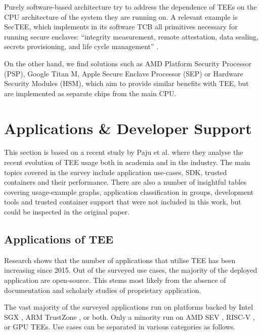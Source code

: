\documentclass[runningheads,a4paper]{uwsese}
\begin{document}
Purely software-based architecture try to address the dependence of \glspl{TEE}
on the \gls{CPU} architecture of the system they are running on. A relevant example
is SecTEE, which implements in its software \gls{TCB} all primitives necessary
for running secure enclaves: ``integrity measurement, remote attestation, data
sealing, secrets provisioning, and life cycle management'' \cite{sec_tee}.

On the other hand, we find solutions such as AMD Platform Security Processor
(PSP), Google Titan M, Apple Secure Enclave Processor (SEP) or Hardware
Security Modules (HSM), which aim to provide similar benefits with \gls{TEE},
but are implemented as separate chips from the main \gls{CPU}.



\section{Applications \& Developer Support}

This section is based on a recent study by Paju et al. \cite{tee_app_rev} where
they analyse the recent evolution of \gls{TEE} usage both in academia and in the
industry. The main topics covered in the survey include application use-cases,
\gls{SDK}, trusted containers and their performance.
There are also a number of insightful tables covering usage-example graphs,
application classification in groups, development tools and trusted container
support that were not included in this work, but could be inspected in the
original paper.

\subsection{Applications of \gls{TEE}}

Research shows that the number of applications that utilise \gls{TEE} has been
increasing since 2015. Out of the surveyed use cases, the majority of the
deployed application are open-source. This stems most likely from the absence
of documentation and scholarly studies of proprietary application.

The vast majority of the surveyed applications run on platforms backed by Intel
SGX \cite{intel_sgx}, ARM TrustZone \cite{arm_tz}, or both. Only a minority run
on AMD SEV \cite{amd_sev}, RISC-V \cite{tee_keystone}, or GPU TEEs. Use cases
can be separated in various categories as follows.
\end{document}
